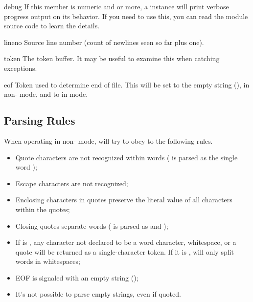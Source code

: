 \begin{memberdesc}{debug}
If this member is numeric and  or more, a 
instance will print verbose progress output on its behavior.  If you
need to use this, you can read the module source code to learn the
details.
\end{memberdesc}

\begin{memberdesc}{lineno}
Source line number (count of newlines seen so far plus one).
\end{memberdesc}

\begin{memberdesc}{token}
The token buffer.  It may be useful to examine this when catching
exceptions.
\end{memberdesc}

\begin{memberdesc}{eof}
Token used to determine end of file. This will be set to the empty
string (), in non-\POSIX{} mode, and to  in
\POSIX{} mode.
\end{memberdesc}

\subsection{Parsing Rules\label{shlex-parsing-rules}}

When operating in non-\POSIX{} mode,  will try to obey to
the following rules.

\begin{itemize}
\item Quote characters are not recognized within words
      ( is parsed as the single word
      );
\item Escape characters are not recognized;
\item Enclosing characters in quotes preserve the literal value of
      all characters within the quotes;
\item Closing quotes separate words ( is parsed
      as  and );
\item If  is , any character not
      declared to be a word character, whitespace, or a quote will be
      returned as a single-character token. If it is ,
       will only split words in whitespaces;
\item EOF is signaled with an empty string ();
\item It's not possible to parse empty strings, even if quoted.
\end{itemize}

